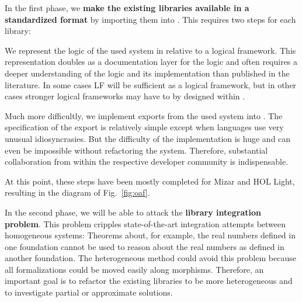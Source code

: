 In the first phase, we \textbf{make the existing libraries available in a standardized format} by importing them into \mmt.
This requires two steps for each library:
\begin{compactenum}
\item We represent the logic of the used system in \mmt relative to a logical framework.
This representation doubles as a documentation layer for the logic and often requires a deeper understanding of the logic and its implementation than published in the literature.
In some cases LF will be sufficient as a logical framework, but in other cases stronger logical frameworks may have to by designed within \mmt.
\item Much more difficultly, we implement exports from the used system into \mmt.
The specification of the export is relatively simple except when languages use very unusual idiosyncrasies.
But the difficulty of the implementation is huge and can even be impossible without refactoring the system.
Therefore, substantial collaboration from within the respective developer community is indispensable.
\end{compactenum}
At this point, these steps have been mostly completed for Mizar and HOL Light, resulting in the \mmt diagram of Fig.~\ref{fig:oaf}.

In the second phase, we will be able to attack the \textbf{library integration problem}.
This problem cripples state-of-the-art integration attempts between homogeneous systems: Theorems about, for example, the real numbers defined in one foundation cannot be used to reason about the real numbers as defined in another foundation.
The heterogeneous method could avoid this problem because all formalizations could be moved easily along morphisms.
Therefore, an important goal is to refactor the existing libraries to be more heterogeneous and to investigate partial or approximate solutions.



